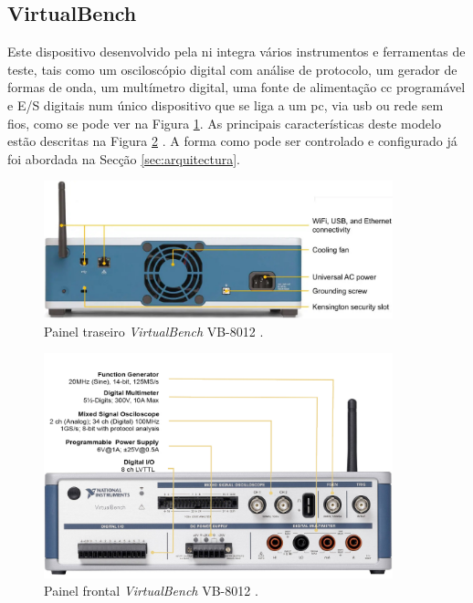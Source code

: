 \subsection{VirtualBench}
Este dispositivo desenvolvido pela \acrshort{ni} integra vários instrumentos e ferramentas de teste, tais como um osciloscópio digital com análise de protocolo, um gerador de formas de onda, um multímetro digital, uma fonte de alimentação \acrfull{cc} programável e E/S digitais num único dispositivo que se liga a um \acrshort{pc}, via \acrshort{usb} ou rede sem fios, como se pode ver na Figura \ref{fig:paineltraseiro}. As principais características deste modelo estão descritas na Figura \ref{fig:paineldianteiro} \cite{datasheetVirtualBench}. A forma como pode ser controlado e configurado já foi abordada na Secção \ref{sec:arquitectura}.

\begin{figure}[hbtp]
    \centering
    \centering
    \includegraphics[width=0.9\textwidth]{figures/virtualbench_back-panel.jpg}
    \caption{Painel traseiro \textit{VirtualBench} VB-8012  \cite{datasheetVirtualBench}.}
    \label{fig:paineltraseiro}
\end{figure}

\begin{figure}[hbtp]
    \centering
    \includegraphics[width=0.9\textwidth]{figures/virtualbench_front-panel.jpg}
    \caption{Painel frontal \textit{VirtualBench} VB-8012  \cite{datasheetVirtualBench}.}
    \label{fig:paineldianteiro}
\end{figure}

